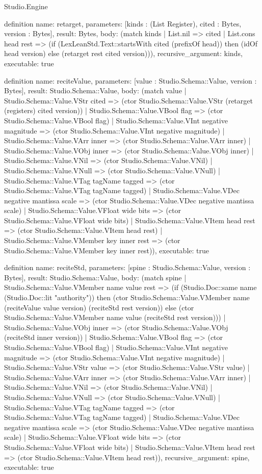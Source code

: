 \begin{lexlean}{Studio.Engine}
\begin{semanticmodule}
definition{
  name: retarget,
  parameters: [kinds : (List Register), cited : Bytes, version : Bytes],
  result: Bytes,
  body: (match kinds
    | List.nil => cited
    | List.cons head rest => (if (LexLeanStd.Text::startsWith cited (prefixOf head)) then (idOf head version) else (retarget rest cited version))),
  recursive_argument: kinds,
  executable: true
}

definition{
  name: reciteValue,
  parameters: [value : Studio.Schema::Value, version : Bytes],
  result: Studio.Schema::Value,
  body: (match value
    | Studio.Schema::Value.VStr cited => (ctor Studio.Schema::Value.VStr (retarget (registers) cited version))
    | Studio.Schema::Value.VBool flag => (ctor Studio.Schema::Value.VBool flag)
    | Studio.Schema::Value.VInt negative magnitude => (ctor Studio.Schema::Value.VInt negative magnitude)
    | Studio.Schema::Value.VArr inner => (ctor Studio.Schema::Value.VArr inner)
    | Studio.Schema::Value.VObj inner => (ctor Studio.Schema::Value.VObj inner)
    | Studio.Schema::Value.VNil => (ctor Studio.Schema::Value.VNil)
    | Studio.Schema::Value.VNull => (ctor Studio.Schema::Value.VNull)
    | Studio.Schema::Value.VTag tagName tagged => (ctor Studio.Schema::Value.VTag tagName tagged)
    | Studio.Schema::Value.VDec negative mantissa scale => (ctor Studio.Schema::Value.VDec negative mantissa scale)
    | Studio.Schema::Value.VFloat wide bits => (ctor Studio.Schema::Value.VFloat wide bits)
    | Studio.Schema::Value.VItem head rest => (ctor Studio.Schema::Value.VItem head rest)
    | Studio.Schema::Value.VMember key inner rest => (ctor Studio.Schema::Value.VMember key inner rest)),
  executable: true
}

definition{
  name: reciteStd,
  parameters: [spine : Studio.Schema::Value, version : Bytes],
  result: Studio.Schema::Value,
  body: (match spine
    | Studio.Schema::Value.VMember name value rest => (if (Studio.Doc::same name (Studio.Doc::lit "authority")) then (ctor Studio.Schema::Value.VMember name (reciteValue value version) (reciteStd rest version)) else (ctor Studio.Schema::Value.VMember name value (reciteStd rest version)))
    | Studio.Schema::Value.VObj inner => (ctor Studio.Schema::Value.VObj (reciteStd inner version))
    | Studio.Schema::Value.VBool flag => (ctor Studio.Schema::Value.VBool flag)
    | Studio.Schema::Value.VInt negative magnitude => (ctor Studio.Schema::Value.VInt negative magnitude)
    | Studio.Schema::Value.VStr value => (ctor Studio.Schema::Value.VStr value)
    | Studio.Schema::Value.VArr inner => (ctor Studio.Schema::Value.VArr inner)
    | Studio.Schema::Value.VNil => (ctor Studio.Schema::Value.VNil)
    | Studio.Schema::Value.VNull => (ctor Studio.Schema::Value.VNull)
    | Studio.Schema::Value.VTag tagName tagged => (ctor Studio.Schema::Value.VTag tagName tagged)
    | Studio.Schema::Value.VDec negative mantissa scale => (ctor Studio.Schema::Value.VDec negative mantissa scale)
    | Studio.Schema::Value.VFloat wide bits => (ctor Studio.Schema::Value.VFloat wide bits)
    | Studio.Schema::Value.VItem head rest => (ctor Studio.Schema::Value.VItem head rest)),
  recursive_argument: spine,
  executable: true
}


\end{semanticmodule}
\end{lexlean}
